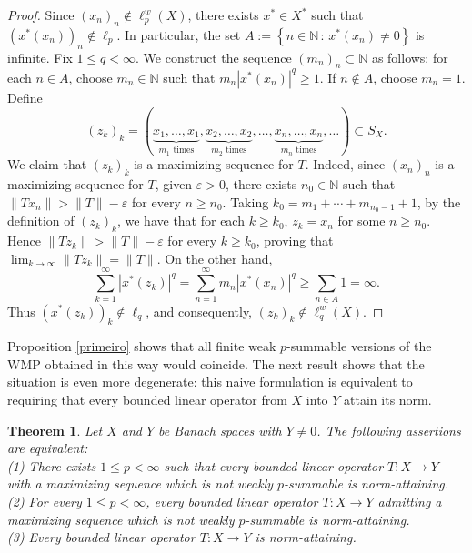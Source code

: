 \documentclass[12 pt]{article}%
\newtheorem{theorem}{Theorem}[section]
\newtheorem{final remark}[theorem]{Final Remark}
\newcommand {\N} {\mathbb{N}}
\newcommand{\norma}[1]{\| #1 \|}
\newcommand{\conj}[2]{\left \{ {#1} \, : \, {#2} \right \}}
\begin{document}
\begin{proof}
Since $(x_n)_n\notin \ell_p^w(X)$, there exists $x^*\in X^*$ such that $(x^*(x_n))_n\notin \ell_p.$
In particular, the set
$A:=\conj{n \in \N}{x^*(x_n) \neq 0}$
is infinite. Fix $1\leq q<\infty$. We construct the sequence $(m_n)_n \subset \N$ as follows: for each $n\in A$, choose $m_n\in\N$ such that  $m_n |x^*(x_n)|^q\geq 1$. If $n\notin A$, choose $m_n=1$. Define
$$ (z_k)_k   =  (\underbrace{x_1,\ldots,x_1}_{m_1\text{ times}},   \underbrace{x_2,\ldots,x_2}_{m_2\text{ times}},  \ldots,  \underbrace{x_n,\ldots,x_n}_{m_n\text{ times}},    \ldots) \subset S_X.$$
We claim that $(z_k)_k$ is a maximizing sequence for $T$. Indeed, since
$(x_n)_n$ is a maximizing sequence for $T$, given $\varepsilon > 0$, there exists $n_0 \in \N$ such that $\norma{Tx_n} > \norma{T} - \varepsilon$ for every $n \geq n_0$. Taking $k_0 = m_1 + \cdots + m_{n_0 -1} + 1$, by the definition of $(z_k)_k$, we have that for each $k \geq k_0$, $z_k = x_n$ for some $n \geq n_0$. Hence $\norma{Tz_k} > \norma{T} - \varepsilon$ for every $k \geq k_0$, proving that $\displaystyle \lim_{k \to \infty} \norma{Tz_k} = \norma{T}$.
On the other hand,
$$    \sum_{k=1}^{\infty} |x^*(z_k)|^q
    =
    \sum_{n=1}^{\infty} m_n |x^*(x_n)|^q
    \geq
    \sum_{n\in A} 1
    =
    \infty.$$
Thus $(x^*(z_k))_k\notin \ell_q$, and consequently,  $(z_k)_k\notin \ell_q^w(X).$
\end{proof}

Proposition \ref{primeiro} shows that all finite weak $p$-summable versions of the $\mathrm{WMP}$ obtained in this way would coincide. The next result shows that the situation is even more degenerate: this naive formulation is equivalent to requiring that every bounded linear operator from $X$ into $Y$ attain its norm.

\begin{theorem}
Let $X$ and $Y$ be Banach spaces with $Y\neq{0}$. The following assertions are equivalent: \\
{\rm (1)} There exists $1\leq p<\infty$ such that every bounded linear operator $T:X\to Y$ with a maximizing sequence which is not weakly $p$-summable is norm-attaining. \\
{\rm (2)} For every $1\leq p<\infty$, every bounded linear operator $T:X\to Y$ admitting a maximizing sequence which is not weakly $p$-summable is norm-attaining. \\
{\rm (3)} Every bounded linear operator $T:X\to Y$ is norm-attaining.
\end{theorem}
\end{document}
